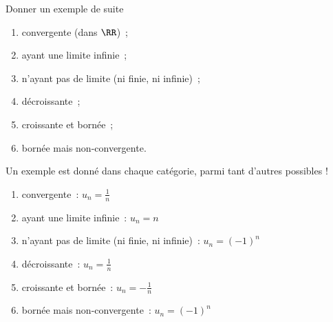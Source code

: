 \documentclass[12pt,french,oneside,a4paper]{memoir} %
\begin{document}
\begin{exo}
Donner un exemple de suite
  \begin{enumerate}
  \item convergente (dans $\RR$)~;
  \item ayant une limite infinie~;
  \item n'ayant pas de limite (ni finie, ni infinie)~;
  \item décroissante~;
  \item croissante et bornée~;
  \item bornée mais non-convergente.                   
  \end{enumerate}
\begin{correction}
  Un exemple est donné dans chaque catégorie, parmi tant d'autres possibles !
  \begin{enumerate}
  \item convergente~: $u_{n} = \frac 1n$
  \item ayant une limite infinie~: $u_{n} = n$
  \item n'ayant pas de limite (ni finie, ni infinie)~: $u_{n} = (-1)^{n}$
  \item décroissante~: $u_{n} = \frac 1n$
  \item croissante et bornée~: $u_{n} = -\frac 1n$
  \item bornée mais non-convergente~: $u_{n} = (-1)^{n}$
  \end{enumerate}
\end{correction}
\end{exo}
\end{document}
